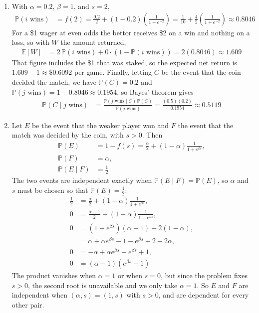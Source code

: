 \documentclass[11pt]{article}
\newcommand{\E}{\mathbb{E}}
\newcommand{\Prob}{\mathbb{P}}
\begin{document}
\begin{enumerate}[label=(\alph*)]
  \item With $\alpha = 0.2$, $\beta = 1$, and $s = 2$,
  \begin{align}
    \Prob(i \text{ wins}) &= f(2) = \frac{0.2}{2} + (1-0.2)\left(\frac{1}{1+e^{-2}}\right)
    = \frac{1}{10} + \frac{4}{5}\left(\frac{1}{1+e^{-2}}\right) \approx \num{0.8046}
  \end{align}
  For a \$1 wager at even odds the bettor receives \$2 on a win and nothing on a loss, so with
  $W$ the amount returned,
  \begin{align}
    \E[W] &= 2\,\Prob(i \text{ wins}) + 0\cdot\left(1 - \Prob(i \text{ wins})\right)
    = 2(\num{0.8046}) \approx \num{1.609}
  \end{align}
  That figure includes the \$1 that was staked, so the expected net return is
  $\num{1.609} - 1 \approx \$\num{0.6092}$ per game. Finally, letting $C$ be the event that the coin
  decided the match, we have $\Prob(C) = 0.2$ and
  $\Prob(j \text{ wins}) = 1 - \num{0.8046} \approx \num{0.1954}$, so Bayes' theorem gives
  \begin{align}
    \Prob(C \mid j \text{ wins}) &= \frac{\Prob(j \text{ wins} \mid C)\,\Prob(C)}{\Prob(j \text{ wins})}
    = \frac{(0.5)(0.2)}{\num{0.1954}} \approx \num{0.5119}
  \end{align}

  \item Let $E$ be the event that the weaker player won and $F$ the event that the match was decided
  by the coin, with $s > 0$. Then
  \begin{align}
    \Prob(E) &= 1 - f(s) = \frac{\alpha}{2} + (1-\alpha)\frac{1}{1+e^{\beta s}}, \\
    \Prob(F) &= \alpha, \\
    \Prob(E \mid F) &= \frac{1}{2}
  \end{align}
  The two events are independent exactly when $\Prob(E \mid F) = \Prob(E)$, so $\alpha$ and $s$ must
  be chosen so that $\Prob(E) = \tfrac{1}{2}$:
  \begin{align}
    \frac{1}{2} &= \frac{\alpha}{2} + (1-\alpha)\frac{1}{1+e^{\beta s}}, \\
    0 &= \frac{\alpha-1}{2} + (1-\alpha)\frac{1}{1+e^{\beta s}}, \\
    0 &= (1+e^{\beta s})(\alpha-1) + 2(1-\alpha), \\
    &= \alpha + \alpha e^{\beta s} - 1 - e^{\beta s} + 2 - 2\alpha, \\
    0 &= -\alpha + \alpha e^{\beta s} - e^{\beta s} + 1, \\
    0 &= (\alpha - 1)\left(e^{\beta s} - 1\right)
  \end{align}
  The product vanishes when $\alpha = 1$ or when $s = 0$, but since the problem fixes $s > 0$, the
  second root is unavailable and we only take $\alpha = 1$. So $E$ and $F$ are independent when $(\alpha, s) = (1, s)$ with $s > 0$, and are dependent for every other pair.


\end{enumerate}
\end{document}
